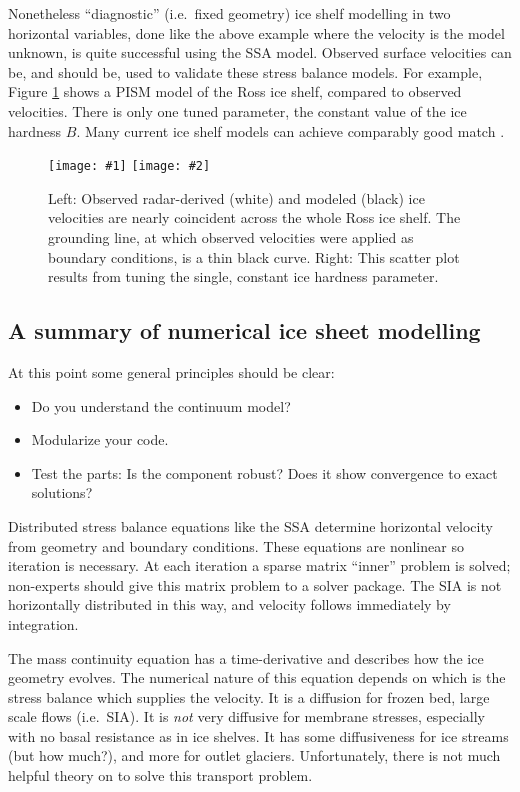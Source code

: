 \documentclass[titlepage,letterpaper,final,12pt]{scrartcl}
\newcommand{\twofigsizes}[5]{
\begin{figure}[ht]
\centering
\texttt{[image: \#1]} \quad
\texttt{[image: \#2]}
\caption{#3}
\label{fig:#1}
\end{figure}}
\begin{document}
Nonetheless ``diagnostic'' (i.e.~fixed geometry) ice shelf modelling in two horizontal variables, done like the above example where the velocity is the model unknown, is quite successful using the SSA model.  Observed surface velocities can be, and should be, used to validate these stress balance models.  For example, Figure \ref{fig:rossquiver} shows a PISM model of the Ross ice shelf, compared to observed velocities.  There is only one tuned parameter, the constant value of the ice hardness $B$.  Many current ice shelf models can achieve comparably good match \cite{MacAyealetal}.

\twofigsizes{rossquiver}{rossscatter}{Left: Observed radar-derived (white) and modeled (black) ice velocities are nearly coincident across the whole Ross ice shelf.  The grounding line, at which observed velocities were applied as boundary conditions, is a thin black curve.  Right: This scatter plot results from tuning the single, constant ice hardness parameter.}{2.7in}{3.0in}


\subsection{A summary of numerical ice sheet modelling}

At this point some general principles should be clear:
\begin{itemize}
\item Do you understand the continuum model?
\item Modularize your code.
\item Test the parts: Is the component robust? Does it show convergence to exact solutions?
\end{itemize}

Distributed stress balance equations like the SSA determine horizontal velocity from geometry and boundary conditions.  These equations are nonlinear so iteration is necessary.  At each iteration a sparse matrix ``inner'' problem is solved; non-experts should give this matrix problem to a solver package.  The SIA is not horizontally distributed in this way, and velocity follows immediately by integration.

The mass continuity equation has a time-derivative and describes how the ice geometry evolves.  The numerical nature of this equation depends on which is the stress balance which supplies the velocity.  It is a diffusion for frozen bed, large scale flows (i.e.~SIA).  It is \emph{not} very diffusive for membrane stresses, especially with no basal resistance as in ice shelves.  It has some diffusiveness for ice streams (but how much?), and more for outlet glaciers.  Unfortunately, there is not much helpful theory on to solve this transport problem.
\end{document}
